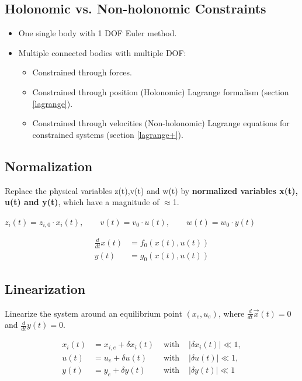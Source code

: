 \documentclass[10pt,a4paper]{scrartcl}
\begin{document}
\begin{multicols*}{3}
\vfill

\subsection{Holonomic vs. Non-holonomic Constraints}
\begin{itemize}
\item One single body with 1 DOF \dahe Euler method.
\item Multiple connected bodies with multiple DOF:
\begin{itemize}
	\item Constrained through forces.
	\item Constrained through position (Holonomic) \dahe Lagrange formalism (section \ref{lagrange}).
	\item Constrained through velocities (Non-holonomic) \dahe Lagrange equations for constrained systems (section \ref{lagrange+}).
\end{itemize}
\end{itemize}

\columnbreak

\subsection{Normalization}
	Replace the physical variables z(t),v(t) and w(t) by \textbf{normalized variables x(t), u(t) and y(t)}, which have a magnitude of $\approx$1.
	
	$z_i(t)=z_{i,0}\cdot x_i(t),\qquad v(t)=v_0\cdot u(t),\qquad w(t)=w_0\cdot y(t)$
	
	\begin{align*}
	\frac{d}{dt}x(t)&=f_0(x(t),u(t))\\
	y(t)&=g_0(x(t),u(t))
	\end{align*}
	
\subsection{Linearization}
	
Linearize the system around an equilibrium point $(x_e,u_e)$, where $\frac{d}{dt}\vec{x}(t)=0$ and $\frac{d}{dt}y(t)=0$.
	
\begin{alignat*}{4}
x_i(t)&=x_{i,e}+\delta x_i(t)&\text{ with  }&|\delta x_i(t)|\ll 1,\\
u(t)&=u_e+\delta u(t)&\text{ with  }&|\delta u(t)|\ll 1,\\
y(t)&=y_e+\delta y(t)&\text{ with  } &|\delta y(t)|\ll 1
\end{alignat*}
	

\end{multicols*}
\end{document}
